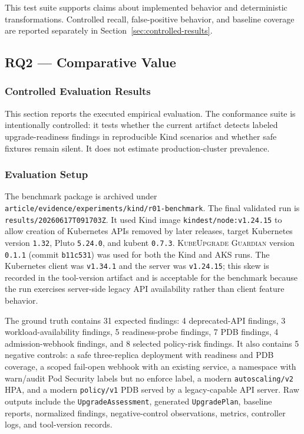 \documentclass[10pt,journal]{IEEEtran}
\newcommand{\tool}{\textsc{KubeUpgrade Guardian}}
\newcommand{\crd}[1]{\texttt{#1}}
\newcommand{\code}[1]{\texttt{#1}}
\begin{document}
This test suite supports claims about implemented behavior and deterministic transformations. Controlled recall, false-positive behavior, and baseline coverage are reported separately in Section~\ref{sec:controlled-results}.

\subsection{RQ2 --- Comparative Value}\label{sec:rq2}

\subsubsection*{Controlled Evaluation Results}
\label{sec:controlled-results}
This section reports the executed empirical evaluation. The conformance suite is intentionally controlled: it tests whether the current artifact detects labeled upgrade-readiness findings in reproducible Kind scenarios and whether safe fixtures remain silent. It does not estimate production-cluster prevalence.

\subsubsection*{Evaluation Setup}
The benchmark package is archived under \code{article/evidence/experiments/kind/r01-benchmark}. The final validated run is \code{results/20260617T091703Z}. It used Kind image \code{kindest/node:v1.24.15} to allow creation of Kubernetes APIs removed by later releases, target Kubernetes version \code{1.32}, Pluto \code{5.24.0}, and kubent \code{0.7.3}. \tool{} version \code{0.1.1} (commit \code{b11c531}) was used for both the Kind and AKS runs. The Kubernetes client was \code{v1.34.1} and the server was \code{v1.24.15}; this skew is recorded in the tool-version artifact and is acceptable for the benchmark because the run exercises server-side legacy API availability rather than client feature behavior.

The ground truth contains 31 expected findings: 4 deprecated-API findings, 3 workload-availability findings, 5 readiness-probe findings, 7 PDB findings, 4 admission-webhook findings, and 8 selected policy-risk findings. It also contains 5 negative controls: a safe three-replica deployment with readiness and PDB coverage, a scoped fail-open webhook with an existing service, a namespace with warn/audit Pod Security labels but no enforce label, a modern \code{autoscaling/v2} HPA, and a modern \code{policy/v1} PDB served by a legacy-capable API server. Raw outputs include the \crd{UpgradeAssessment}, generated \crd{UpgradePlan}, baseline reports, normalized findings, negative-control observations, metrics, controller logs, and tool-version records.
\end{document}
